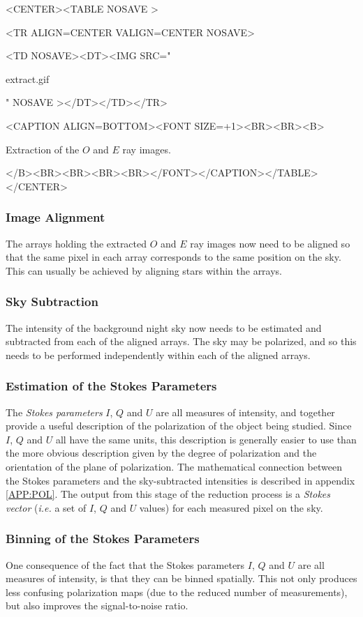 \documentclass[twoside,11pt]{article}
\newcommand{\hyperref}[4]{#2\ref{#4}#3}
\renewcommand{\_}{\texttt{\symbol{95}}}
\newcommand{\htmlfig}[3]{
   \label{#1}
   \begin{rawhtml} <CENTER><TABLE NOSAVE > \end{rawhtml}
   \begin{rawhtml} <TR ALIGN=CENTER VALIGN=CENTER NOSAVE> \end{rawhtml}
   \begin{rawhtml} <TD NOSAVE><DT><IMG SRC=" \end{rawhtml}
   #2
   \begin{rawhtml} " NOSAVE ></DT></TD></TR> \end{rawhtml}
   \begin{rawhtml} <CAPTION ALIGN=BOTTOM><FONT SIZE=+1><BR><BR><B> \end{rawhtml}
   #3 
   \begin{rawhtml} </B><BR><BR><BR><BR></FONT></CAPTION></TABLE></CENTER> \end{rawhtml}
}
\begin{document}
\begin{htmlonly}
\htmlfig{fig:extract}{extract.gif}{
Extraction of the $O$ and $E$ ray images.}
\end{htmlonly}

\subsubsection{Image Alignment}
The arrays holding the extracted $O$ and $E$ ray images now need to be
aligned so that the same pixel in each array corresponds to the same
position on the sky. This can usually be achieved by aligning stars
within the arrays.

\subsubsection{Sky Subtraction}
The intensity of the background night sky now needs to be estimated and
subtracted from each of the aligned arrays. The sky may be polarized, and
so this needs to be performed independently within each of the aligned arrays.

\subsubsection{Estimation of the Stokes Parameters}
The \emph{Stokes parameters} $I$, $Q$ and $U$ are all measures of intensity,
and together provide a useful description of the polarization of the object
being studied. Since $I$, $Q$ and $U$ all have the same units, this
description is generally easier to use than the more obvious description
given by the degree of polarization and the orientation of the plane of
polarization. The mathematical connection between the Stokes parameters 
and the sky-subtracted intensities is described \hyperref{here}{in
appendix }{}{APP:POL}. The output from this stage of the reduction process
is a \emph{Stokes vector} (\emph{i.e.} a set of $I$, $Q$ and $U$ values) for each
measured pixel on the sky.

\subsubsection{Binning of the Stokes Parameters}
One consequence of the fact that the Stokes parameters $I$, $Q$ and $U$
are all measures of intensity, is that they can be binned spatially. This
not only produces less confusing polarization maps (due to the reduced
number of measurements), but also improves the signal-to-noise ratio.
\end{document}
